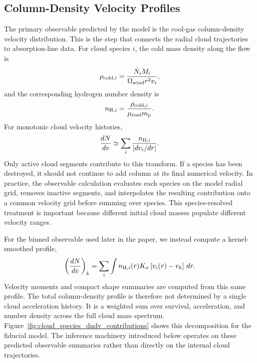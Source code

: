 \subsection{Column-Density Velocity Profiles}
\label{subsec:model_observables}

The primary observable predicted by the model is the cool-gas column-density velocity distribution.
This is the step that connects the radial cloud trajectories to absorption-line data.
For cloud species $i$, the cold mass density along the flow is
\begin{equation}
\rho_{{\rm cold},i}
=
\frac{\dot{N}_i M_i}
{\Omega_{\rm wind}r^2v_i},
\end{equation}
and the corresponding hydrogen number density is
\begin{equation}
n_{{\rm H},i}
=
\frac{\rho_{{\rm cold},i}}{\mu_{\rm cool}m_p}.
\end{equation}
For monotonic cloud velocity histories,
\begin{equation}
\frac{dN}{dv}
\simeq
\sum_i
\frac{n_{{\rm H},i}}{\left|dv_i/dr\right|}.
\end{equation}
Only active cloud segments contribute to this transform.
If a species has been destroyed, it should not continue to add column at its final numerical velocity.
In practice, the observable calculation evaluates each species on the model radial grid, removes inactive segments, and interpolates the resulting contribution onto a common velocity grid before summing over species.
This species-resolved treatment is important because different initial cloud masses populate different velocity ranges.

For the binned observable used later in the paper, we instead compute a kernel-smoothed profile,
\begin{equation}
\left(\frac{dN}{dv}\right)_k
=
\sum_i
\int
n_{{\rm H},i}(r)
K_\sigma\left[v_i(r)-v_k\right]\,dr .
\end{equation}
Velocity moments and compact shape summaries are computed from this same profile.
The total column-density profile is therefore not determined by a single cloud acceleration history.
It is a weighted sum over survival, acceleration, and number density across the full cloud mass spectrum.
Figure~\ref{fig:cloud_species_dndv_contributions} shows this decomposition for the fiducial model.
The inference machinery introduced below operates on these predicted observable summaries rather than directly on the internal cloud trajectories.


